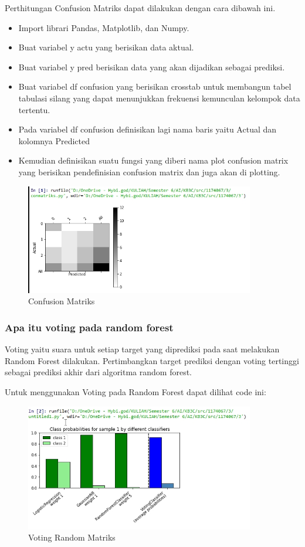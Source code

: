 \hfill\break
Perthitungan Confusion Matriks dapat dilakukan dengan cara dibawah ini.
\begin{itemize}
\item
Import librari Pandas, Matplotlib, dan Numpy.
\item
Buat variabel y actu yang berisikan data aktual.
\item
Buat variabel y pred berisikan data yang akan dijadikan sebagai prediksi.
\item
Buat variabel df confusion yang berisikan crosstab untuk membangun tabel tabulasi silang yang dapat menunjukkan frekuensi kemunculan kelompok data tertentu.
\item
Pada variabel df confusion definisikan lagi nama baris yaitu Actual dan kolomnya Predicted
\item
Kemudian definisikan suatu fungsi yang diberi nama plot confusion matrix yang berisikan pendefinisian confusion matrix dan juga akan di plotting.

\end{itemize}
\begin{figure}[H]
\centerline{\includegraphics[width=10cm]{figures/1174067/3/2.jpg}}
\caption{Confusion Matriks}
\label{labelgambar}
\end{figure}

\subsubsection{Apa itu voting pada random forest}

\hfill\break
Voting yaitu suara untuk setiap target yang diprediksi pada saat melakukan Random Forest dilakukan. Pertimbangkan target prediksi dengan voting tertinggi sebagai prediksi akhir dari algoritma random forest.

Untuk menggunakan Voting pada Random Forest dapat dilihat code ini:

\begin{figure}[H]
\centerline{\includegraphics[width=10cm]{figures/1174067/3/3.jpg}}
\caption{Voting Random Matriks}
\label{labelgambar}
\end{figure}


